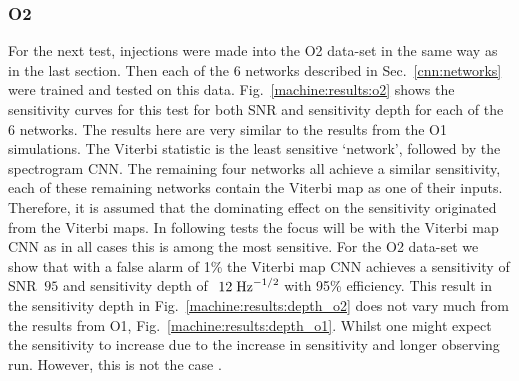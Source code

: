 \subsubsection{O2}

For the next test, injections were made into the O2 data-set in the same way as in the last section. Then each of the 6 networks described in Sec.~\ref{cnn:networks} were trained and tested on this data. 
Fig.~\ref{machine:results:o2} shows the sensitivity curves for this test for both \ac{SNR} and sensitivity depth for each of the 6 networks.
The results here are very similar to the results from the O1 simulations.
The Viterbi statistic is the least sensitive `network', followed by the spectrogram \ac{CNN}.
The remaining four networks all achieve a similar sensitivity, each of these remaining networks contain the Viterbi map as one of their inputs. Therefore, it is assumed that the dominating effect on the sensitivity originated from the Viterbi maps. In following tests the focus will be with the Viterbi map \ac{CNN} as in all cases this is among the most sensitive.
For the O2 data-set we show that with a false alarm of 1\% the Viterbi map \ac{CNN} achieves a sensitivity of SNR $~95$ and sensitivity depth of $~12\; {\rm Hz}^{-1/2}$ with 95\% efficiency.
This result in the sensitivity depth in Fig.~\ref{machine:results:depth_o2} does not vary much from the results from O1, Fig.~\ref{machine:results:depth_o1}. 
Whilst one might expect the sensitivity to increase due to the increase in sensitivity and longer observing run.
However, this is not the case .

